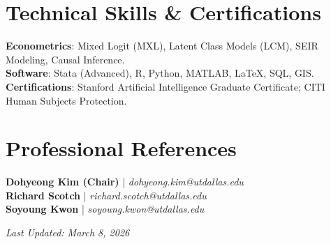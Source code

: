 \documentclass[11pt]{article}
\begin{document}
\section*{Technical Skills \& Certifications}
\textbf{Econometrics}: Mixed Logit (MXL), Latent Class Models (LCM), SEIR Modeling, Causal Inference. \\
\textbf{Software}: Stata (Advanced), R, Python, MATLAB, \LaTeX, SQL, GIS. \\
\textbf{Certifications}: Stanford Artificial Intelligence Graduate Certificate; CITI Human Subjects Protection.

\section*{Professional References}
\textbf{Dohyeong Kim (Chair)} | \textit{dohyeong.kim@utdallas.edu} \\
\textbf{Richard Scotch} | \textit{richard.scotch@utdallas.edu} \\
\textbf{Soyoung Kwon} | \textit{soyoung.kwon@utdallas.edu}

\vspace{1em}
\begin{center}
    \textit{Last Updated: March 8, 2026}
\end{center}
\end{document}
